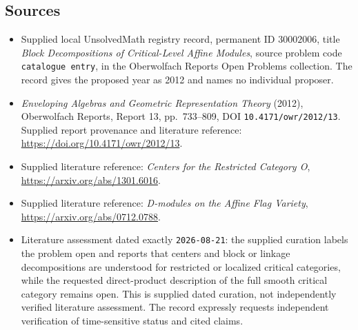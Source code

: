 \documentclass[11pt]{article}
\begin{document}
\subsection{Sources}
\begin{itemize}
\item Supplied local UnsolvedMath registry record, permanent ID \(30002006\), title \emph{Block Decompositions of Critical-Level Affine Modules}, source problem code \texttt{catalogue entry}, in the Oberwolfach Reports Open Problems collection. The record gives the proposed year as 2012 and names no individual proposer.
\item \emph{Enveloping Algebras and Geometric Representation Theory} (2012), Oberwolfach Reports, Report 13, pp.\ 733--809, DOI \texttt{10.4171/owr/2012/13}. Supplied report provenance and literature reference: \url{https://doi.org/10.4171/owr/2012/13}.
\item Supplied literature reference: \emph{Centers for the Restricted Category O}, \url{https://arxiv.org/abs/1301.6016}.
\item Supplied literature reference: \emph{D-modules on the Affine Flag Variety}, \url{https://arxiv.org/abs/0712.0788}.
\item Literature assessment dated exactly \texttt{2026-08-21}: the supplied curation labels the problem open and reports that centers and block or linkage decompositions are understood for restricted or localized critical categories, while the requested direct-product description of the full smooth critical category remains open. This is supplied dated curation, not independently verified literature assessment. The record expressly requests independent verification of time-sensitive status and cited claims.
\end{itemize}
\end{document}
